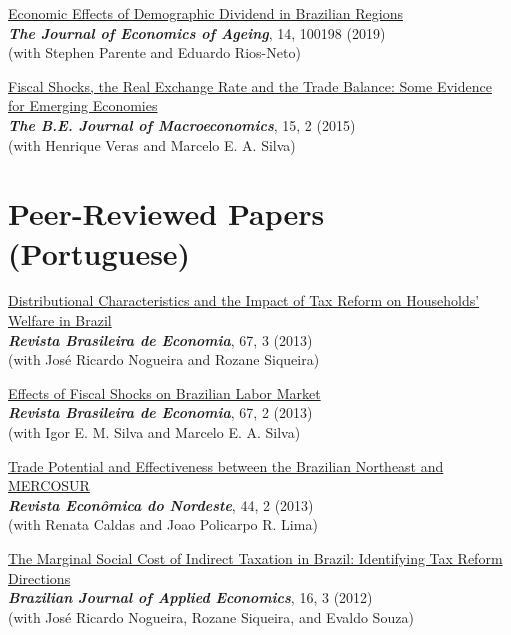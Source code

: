 \documentclass[mm, 10pt]{simple_style}
\begin{document}
\begin{resume}
\href{https://doi.org/10.1016/j.jeoa.2019.100198}{Economic Effects of Demographic Dividend in Brazilian Regions} \\
\textbf{\textit{The Journal of Economics of Ageing}}, 14, 100198 (2019)  \\
(with Stephen Parente and Eduardo Rios-Neto)

\href{https://doi.org/10.1515/bejm-2014-0018}{Fiscal Shocks, the Real Exchange Rate and the Trade Balance: Some Evidence for Emerging Economies} \\
\textbf{\textit{The B.E. Journal of Macroeconomics}}, 15, 2 (2015)  \\
(with Henrique Veras and Marcelo E. A. Silva)


\section{Peer-Reviewed Papers\\ (Portuguese)}

\href{http://bibliotecadigital.fgv.br/ojs/index.php/rbe/article/view/6159}{Distributional Characteristics and the Impact of Tax Reform on Households’ Welfare in Brazil}  \\
\textbf{\textit{Revista Brasileira de Economia}}, 67, 3 (2013) \\
(with Jos\'e Ricardo Nogueira and Rozane Siqueira) 


\href{http://bibliotecadigital.fgv.br/ojs/index.php/rbe/article/view/3890}{Effects of Fiscal Shocks on Brazilian Labor Market} \\
\textbf{\textit{Revista Brasileira de Economia}}, 67, 2 (2013) \\
(with Igor E. M. Silva and Marcelo E. A. Silva) 

\href{https://www.bnb.gov.br/revista/index.php/ren/article/view/78/58}{Trade Potential and Effectiveness between the Brazilian Northeast and MERCOSUR} \\
\textbf{\textit{Revista Econ\^omica do Nordeste}}, 44, 2 (2013) \\
(with Renata Caldas and Joao Policarpo R. Lima) 

\href{https://www.scielo.br/scielo.php?pid=S1413-80502012000300001&script=sci_arttext}{The Marginal Social Cost of Indirect Taxation in Brazil: Identifying Tax Reform Directions} \\
\textbf{\textit{Brazilian Journal of Applied Economics}}, 16, 3 (2012) \\
(with Jos\'e Ricardo Nogueira, Rozane Siqueira, and Evaldo Souza)


\end{resume}
\end{document}
